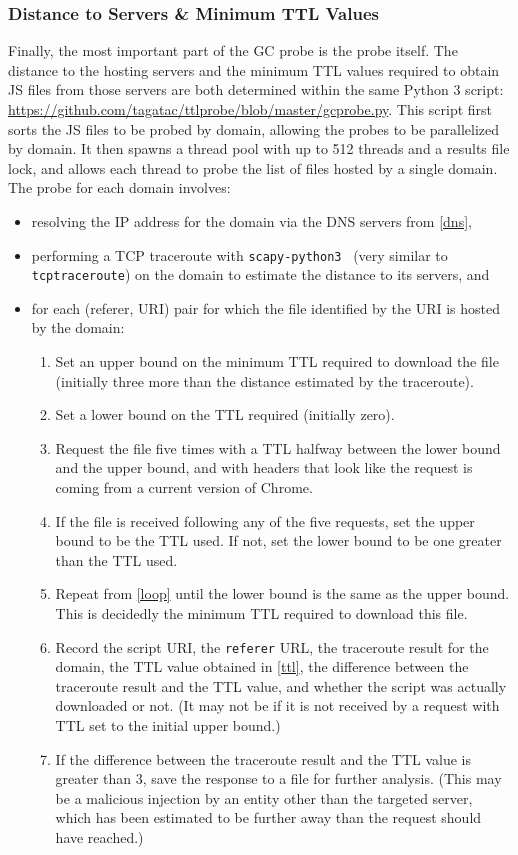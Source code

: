\subsubsection{Distance to Servers \& Minimum TTL Values}\label{distance-ttl}
Finally, the most important part of the GC probe is the probe itself.
The distance to the hosting servers and the minimum TTL values required to obtain JS files from those servers are both determined within the same Python 3 script: \url{https://github.com/tagatac/ttlprobe/blob/master/gcprobe.py}.
This script first sorts the JS files to be probed by domain, allowing the probes to be parallelized by domain.
It then spawns a thread pool with up to 512 threads and a results file lock, and allows each thread to probe the list of files hosted by a single domain.
The probe for each domain involves:
\begin{itemize}\addtolength{\itemsep}{-.35\baselineskip}
	\item resolving the IP address for the domain via the DNS servers from \autoref{dns},
	\item performing a TCP traceroute with \texttt{scapy-python3}~\cite{Dobelis2015} (very similar to \texttt{tcptraceroute}) on the domain to estimate the distance to its servers, and
	\item for each (referer, URI) pair for which the file identified by the URI is hosted by the domain:
	\begin{enumerate}
		\item Set an upper bound on the minimum TTL required to download the file (initially three more than the distance estimated by the traceroute).
		\item Set a lower bound on the TTL required (initially zero).
		\item\label{loop} Request the file five times with a TTL halfway between the lower bound and the upper bound, and with headers that look like the request is coming from a current version of Chrome.
		\item If the file is received following any of the five requests, set the upper bound to be the TTL used.
			If not, set the lower bound to be one greater than the TTL used.
		\item\label{ttl} Repeat from \ref{loop} until the lower bound is the same as the upper bound.
			This is decidedly the minimum TTL required to download this file.
		\item Record the script URI, the \texttt{referer} URL, the traceroute result for the domain, the TTL value obtained in \ref{ttl}, the difference between the traceroute result and the TTL value, and whether the script was actually downloaded or not.
			(It may not be if it is not received by a request with TTL set to the initial upper bound.)
		\item If the difference between the traceroute result and the TTL value is greater than 3, save the response to a file for further analysis.
			(This may be a malicious injection by an entity other than the targeted server, which has been estimated to be further away than the request should have reached.)
	\end{enumerate}
\end{itemize}
